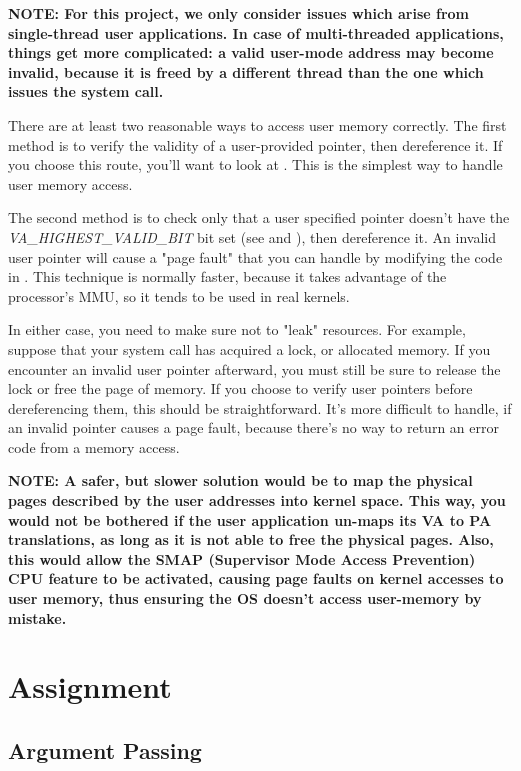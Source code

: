 \textbf{NOTE: For this project, we only consider issues which arise from single-thread user
applications. In case of multi-threaded applications, things get more complicated: a valid user-mode
address may become invalid, because it is freed by a different thread than the one which issues the
system call.}

There are at least two reasonable ways to access user memory correctly. The first method is to
verify the validity of a user-provided pointer, then dereference it. If you choose this route, 
you'll want to look at . This is the simplest way to handle user memory
access.

The second method is to check only that a user specified pointer doesn't have the 
\textit{VA\_HIGHEST\_VALID\_BIT} bit set (see  and
), then dereference it.
An invalid user pointer will cause a "page fault" that you can handle by modifying the code in
. This technique is normally faster, because it takes advantage of the
processor's MMU, so it tends to be used in real kernels.

In either case, you need to make sure not to "leak" resources. For example, suppose that your system
call has acquired a lock, or allocated memory. If you encounter an invalid user pointer afterward,
you must still be sure to release the lock or free the page of memory. If you choose to verify user
pointers before dereferencing them, this should be straightforward. It’s more difficult to handle,
if an invalid pointer causes a page fault, because there’s no way to return an error code from a
memory access.

\textbf{NOTE: A safer, but slower solution would be to map the physical pages described by the user
addresses into kernel space. This way, you would not be bothered if the user application un-maps its
VA to PA translations, as long as it is not able to free the physical pages. Also, this would allow
the SMAP (Supervisor Mode Access Prevention) CPU feature to be activated, causing page faults on
kernel accesses to user memory, thus ensuring the OS doesn't access user-memory by mistake.}

\section{Assignment}

\subsection{Argument Passing}

